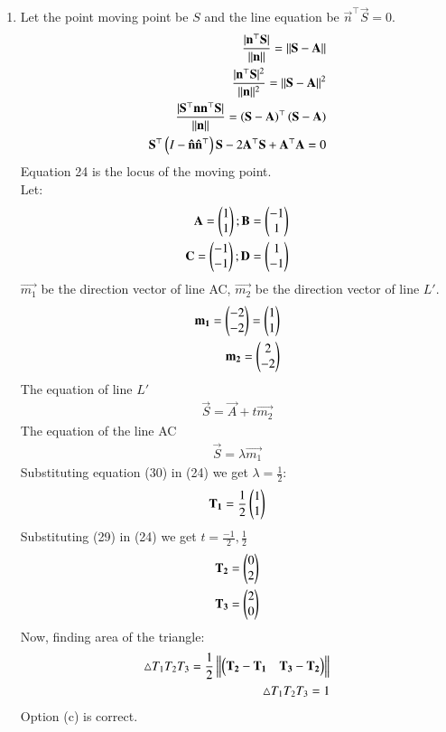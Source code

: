 \documentclass[journal]{IEEEtran}
\begin{document}
\begin{enumerate}
\item Let the point moving point be $S$ and the line equation be $\vec{n}^\top\vec{S}=0$.
\begin{align}
    \frac{|\mathbf{n}^\top\mathbf{S}|}{||\mathbf{n}||}=||\mathbf{S}-\mathbf{A}||\\
    \frac{|\mathbf{n}^\top\mathbf{S}|^2}{||\mathbf{n}||^2}=||\mathbf{S}-\mathbf{A}||^2\\
    \frac{|\mathbf{S}^\top\mathbf{n}\mathbf{n}^\top\mathbf{S}|}{||\mathbf{n}||}=\left(\mathbf{S}-\mathbf{A}\right)^\top\left(\mathbf{S}-\mathbf{A}\right)\\
    \mathbf{S}^\top\left(I-\mathbf{\hat{n}}\mathbf{\hat{n}}^\top\right)\mathbf{S}-2\mathbf{A}^\top\mathbf{S}+\mathbf{A}^\top\mathbf{A}=0
\end{align}
Equation 24 is the locus of the moving point.\\
Let:
\begin{align}
    \mathbf{A}=\begin{pmatrix}1\\1\end{pmatrix};\mathbf{B}=\begin{pmatrix}-1\\1\end{pmatrix}\\
    \mathbf{C}=\begin{pmatrix}-1\\-1\end{pmatrix};\mathbf{D}=\begin{pmatrix}1\\-1\end{pmatrix}
\end{align}
$\vec{m_1}$ be the direction vector of line AC, $\vec{m_2}$ be the direction vector of line $L'$.
\begin{align}
    \mathbf{m_1} = \begin{pmatrix}-2\\-2\end{pmatrix}=\begin{pmatrix}1\\1\end{pmatrix}\\
    \mathbf{m_2} = \begin{pmatrix}2\\-2\end{pmatrix}
\end{align}
The equation of line $L'$ 
\begin{align} \vec{S}=\vec{A}+t\vec{m_2}\end{align}
The equation of the line AC
\begin{align}
\vec{S}=\lambda \vec{m_1}
\end{align}
Substituting equation (30) in (24) we get $\lambda=\frac{1}{2}$:
\begin{align}
    \mathbf{T_1}=\frac{1}{2}\begin{pmatrix}1\\1\end{pmatrix}
\end{align}
Substituting (29) in (24) we get $t=\frac{-1}{2},\frac{1}{2}$
\begin{align}
    \mathbf{T_2}=\begin{pmatrix}0\\2\end{pmatrix}\\
    \mathbf{T_3}=\begin{pmatrix}2\\0\end{pmatrix}
\end{align}
Now, finding area of the triangle:
\begin{align}
    \triangle T_1T_2T_3=\frac{1}{2}\left\lVert\begin{pmatrix}\mathbf{T_2}-\mathbf{T_1}&\mathbf{T_3}-\mathbf{T_2}\end{pmatrix}\right\rVert\\
    \triangle T_1T_2T_3 = 1
\end{align}
Option (c) is correct.



\end{enumerate}
\end{document}
